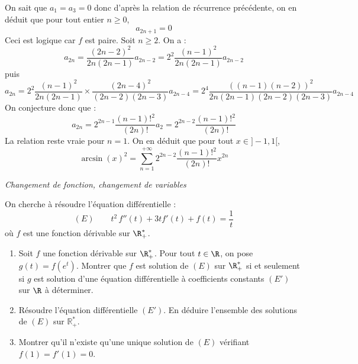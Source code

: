 \documentclass[a4paper,10pt]{report}
\begin{document}
\begin{enumerate}
On sait que $a_1=a_3=0$ donc d'après la relation de récurrence précédente, on en déduit que pour tout entier $n \geq 0$,
$$ a_{2n+1}=0$$
Ceci est logique car $f$ est paire.  Soit $n \geq 2$. On a :
$$ a_{2n} = \dfrac{(2n-2)^2}{2n(2n-1)} a_{2n-2} = 2^2 \dfrac{(n-1)^2}{2n(2n-1)} a_{2n-2}$$
puis
$$ a_{2n} = 2^2 \dfrac{(n-1)^2}{2n(2n-1)} \times \dfrac{(2n-4)^2}{(2n-2)(2n-3)}a_{2n-4} = 2^4 \dfrac{((n-1)(n-2))^2}{2n(2n-1)(2n-2)(2n-3)} a_{2n-4}$$
On conjecture donc que :
$$ a_{2n} = 2^{2n-1} \dfrac{(n-1)!^2}{(2n)!} a_2 = 2^{2n-2} \dfrac{(n-1)!^2}{(2n)!}$$
La relation reste vraie pour $n=1$. On en déduit que pour tout $x \in ]-1,1[$,
$$ \arcsin(x)^2 = \sum_{n=1}^{+ \infty} 2^{2n-2} \dfrac{(n-1)!^2}{(2n)!} x^{2n}$$
\end{enumerate}

\medskip

\begin{center}
\textit{{ {\large Changement de fonction, changement de variables}}}
\end{center}

\medskip

\begin{Exercice}{} On cherche à résoudre l'équation différentielle :
$$ (E) \qquad t^2\,f''(t) + 3 t f'(t)+f(t)  = \dfrac{1}{t} $$
où $f$ est une fonction dérivable sur $\R_+^*$.
\begin{enumerate}
\item Soit $f$ une fonction dérivable sur $\R_+^*$. Pour tout $t\in \R$, on pose $g(t)=f(e^{t})$. Montrer que $f$ est solution de $(E)$ sur $\R_+^*$ si et seulement si $g$ est solution d'une équation différentielle à coefficients constants $(E')$ sur $\R$ à déterminer.
\item Résoudre l'équation différentielle $(E')$. En déduire l'ensemble des solutions de $(E)$ sur $\mathbb{R}^*_+$.
\item Montrer qu'il n'existe qu'une unique solution de $(E)$ vérifiant $f(1)=f'(1)=0$.
\end{enumerate}
\end{Exercice}
\end{document}
